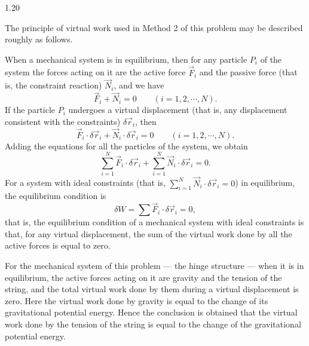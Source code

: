 \begin{solution}{1.20}
\begin{commentary}
The principle of virtual work used in Method 2 of this problem may be described roughly as follows.

When a mechanical system is in equilibrium, then for any particle $P_i$ of the system the forces acting on it are the active force $\vec{F}_i$ and the passive force (that is, the constraint reaction) $\vec{N}_i$, and we have
\[
\vec{F}_i+\vec{N}_i=0\qquad(i=1,2,\cdots,N).
\]
If the particle $P_i$ undergoes a virtual displacement (that is, any displacement consistent with the constraints) $\delta\vec{r}_i$, then
\[
\vec{F}_i\cdot\delta\vec{r}_i+\vec{N}_i\cdot\delta\vec{r}_i=0\qquad(i=1,2,\cdots,N).
\]
Adding the equations for all the particles of the system, we obtain
\[
\sum_{i=1}^{N}\vec{F}_i\cdot\delta\vec{r}_i+\sum_{i=1}^{N}\vec{N}_i\cdot\delta\vec{r}_i=0.
\]
For a system with ideal constraints (that is, $\sum\limits_{i=1}^{N}\vec{N}_i\cdot\delta\vec{r}_i=0$) in equilibrium, the equilibrium condition is
\[
\delta W=\sum\vec{F}_i\cdot\delta\vec{r}_i=0,
\]
that is, the equilibrium condition of a mechanical system with ideal constraints is that, for any virtual displacement, the sum of the virtual work done by all the active forces is equal to zero.

For the mechanical system of this problem — the hinge structure — when it is in equilibrium, the active forces acting on it are gravity and the tension of the string, and the total virtual work done by them during a virtual displacement is zero. Here the virtual work done by gravity is equal to the change of its gravitational potential energy. Hence the conclusion is obtained that the virtual work done by the tension of the string is equal to the change of the gravitational potential energy.
\end{commentary}
\end{solution}

